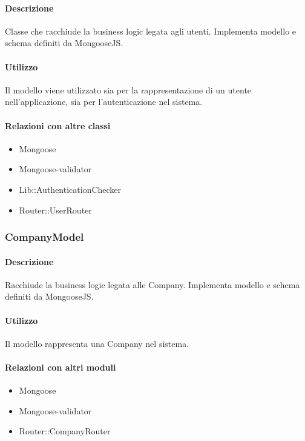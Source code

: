 \paragraph*{Descrizione}
Classe che racchiude la business logic legata agli utenti. Implementa modello e schema definiti da MongooseJS.

\paragraph*{Utilizzo}
Il modello viene utilizzato sia per la rappresentazione di un utente nell'applicazione, sia per l'autenticazione nel sistema.

\paragraph*{Relazioni con altre classi}
\begin{itemize}
\item Mongoose
\item Mongoose-validator
\item Lib::AuthenticationChecker
\item Router::UserRouter
\end{itemize}

\subsubsection{CompanyModel}
\paragraph*{Descrizione}
Racchiude la business logic legata alle Company. Implementa modello e schema definiti da MongooseJS.

\paragraph*{Utilizzo}
Il modello rappresenta una Company nel sistema.

\paragraph*{Relazioni con altri moduli}
\begin{itemize}
\item Mongoose
\item Mongoose-validator
\item Router::CompanyRouter
\end{itemize}

